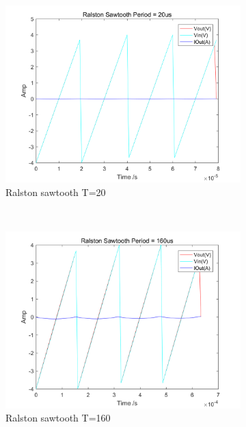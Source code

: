 \documentclass[a4paper, 12pt]{article}
\begin{document}
\begin{figure}[h]
      \centering
      \begin{subfigure}[b]{0.4\textwidth}
            \includegraphics[width=\textwidth]{ex1/ralston_sawtooth_20.png}
            \caption{Ralston sawtooth T=20}
      \end{subfigure}
      ~
      \begin{subfigure}[b]{0.4\textwidth}
            \includegraphics[width=\textwidth]{ex1/ralston_sawtooth_160.png}
            \caption{Ralston sawtooth T=160}
      \end{subfigure}
       ~
      \begin{subfigure}[b]{0.4\textwidth}

\end{subfigure}
\end{figure}
\end{document}
